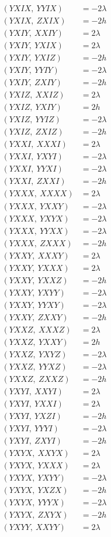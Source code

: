 \documentclass{article}
\begin{document}
\begin{align*}
  (YXIX,\ YYIX) &= - 2 \lambda \\
  (YXIX,\ ZXIX) &= - 2 h \\
  (YXIY,\ XXIY) &= 2 \lambda \\
  (YXIY,\ YXIX) &= 2 \lambda \\
  (YXIY,\ YXIZ) &= - 2 h \\
  (YXIY,\ YYIY) &= - 2 \lambda \\
  (YXIY,\ ZXIY) &= - 2 h \\
  (YXIZ,\ XXIZ) &= 2 \lambda \\
  (YXIZ,\ YXIY) &= 2 h \\
  (YXIZ,\ YYIZ) &= - 2 \lambda \\
  (YXIZ,\ ZXIZ) &= - 2 h \\
  (YXXI,\ XXXI) &= 2 \lambda \\
  (YXXI,\ YXYI) &= - 2 \lambda \\
  (YXXI,\ YYXI) &= - 2 \lambda \\
  (YXXI,\ ZXXI) &= - 2 h \\
  (YXXX,\ XXXX) &= 2 \lambda \\
  (YXXX,\ YXXY) &= - 2 \lambda \\
  (YXXX,\ YXYX) &= - 2 \lambda \\
  (YXXX,\ YYXX) &= - 2 \lambda \\
  (YXXX,\ ZXXX) &= - 2 h \\
  (YXXY,\ XXXY) &= 2 \lambda \\
  (YXXY,\ YXXX) &= 2 \lambda \\
  (YXXY,\ YXXZ) &= - 2 h \\
  (YXXY,\ YXYY) &= - 2 \lambda \\
  (YXXY,\ YYXY) &= - 2 \lambda \\
  (YXXY,\ ZXXY) &= - 2 h \\
  (YXXZ,\ XXXZ) &= 2 \lambda \\
  (YXXZ,\ YXXY) &= 2 h \\
  (YXXZ,\ YXYZ) &= - 2 \lambda \\
  (YXXZ,\ YYXZ) &= - 2 \lambda \\
  (YXXZ,\ ZXXZ) &= - 2 h \\
  (YXYI,\ XXYI) &= 2 \lambda \\
  (YXYI,\ YXXI) &= 2 \lambda \\
  (YXYI,\ YXZI) &= - 2 h \\
  (YXYI,\ YYYI) &= - 2 \lambda \\
  (YXYI,\ ZXYI) &= - 2 h \\
  (YXYX,\ XXYX) &= 2 \lambda \\
  (YXYX,\ YXXX) &= 2 \lambda \\
  (YXYX,\ YXYY) &= - 2 \lambda \\
  (YXYX,\ YXZX) &= - 2 h \\
  (YXYX,\ YYYX) &= - 2 \lambda \\
  (YXYX,\ ZXYX) &= - 2 h \\
  (YXYY,\ XXYY) &= 2 \lambda
\end{align*}
\end{document}
